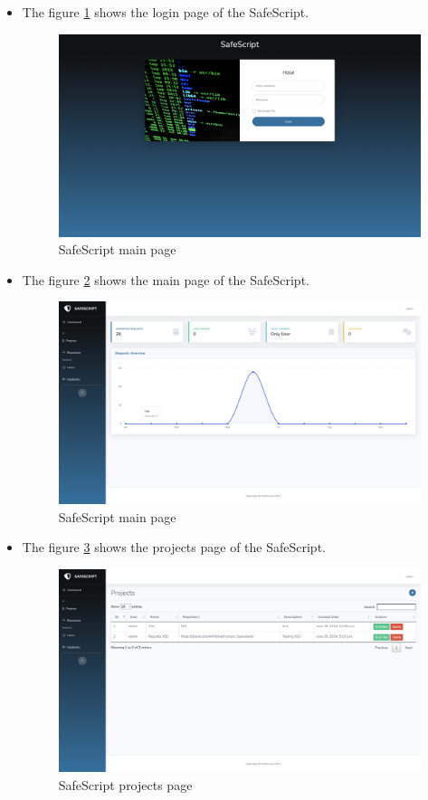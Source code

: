 \begin{itemize}
    \item The figure \ref{img:login} shows the login page of the SafeScript.
    \begin{figure}[H]
        \centering
        \includegraphics[width=0.6\linewidth]{images/login.png}
        \caption{SafeScript main page}
        \label{img:login}
    \end{figure}
    \item The figure \ref{img:mainpage} shows the main page of the SafeScript.
    \begin{figure}[H]
        \centering
        \includegraphics[width=0.6\linewidth]{images/mainpage.png}
        \caption{SafeScript main page}
        \label{img:mainpage}
    \end{figure}
    \item The figure \ref{img:project} shows the projects page of the SafeScript.
    \begin{figure}[H]
        \centering
        \includegraphics[width=0.6\linewidth]{images/projects.png}
        \caption{SafeScript projects page}
        \label{img:project}
    \end{figure}

\end{itemize}
